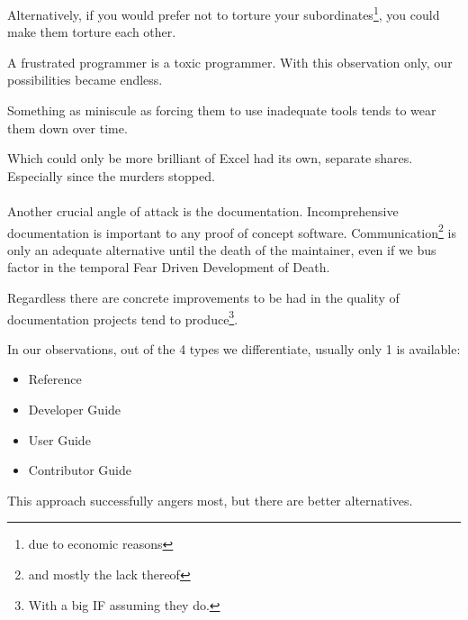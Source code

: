 \documentclass{book}
\begin{document}
    Alternatively,
    if you would prefer not to torture your subordinates\footnote{due to economic reasons},
    you could make them torture each other.

    A frustrated programmer is a toxic programmer.
    With this observation only,
    our possibilities became endless.

    Something as miniscule as forcing them to use inadequate tools
    tends to wear them down over time.

    Which could only be more brilliant of Excel had its own, separate shares.
    Especially since the murders stopped.
    \\

    \\

    Another crucial angle of attack is the documentation.
    Incomprehensive documentation is important %
    to any proof of concept software.          %
    Communication\footnote{and mostly the lack thereof}
    is only an adequate alternative
    until the death of the maintainer,
    even if we bus factor in the temporal Fear Driven Development of Death.
    
    Regardless there are concrete improvements to be had
    in the quality of documentation projects tend to produce\footnote{
        With a big IF assuming they do.
    }.

    In our observations,
    out of the 4 types we differentiate,
    usually only 1 is available:
    \begin{itemize}
        \itemsep-0.5em 
        \item Reference
        \item Developer Guide
        \item User Guide
        \item Contributor Guide
    \end{itemize}
    This approach successfully angers most,
    but there are better alternatives.
\end{document}
